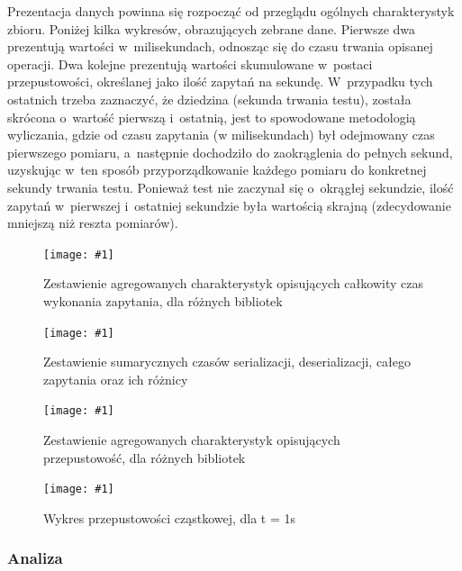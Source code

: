 \documentclass[12pt]{article}
\newcommand{\putfig}[3]{
	\begin{figure}[H]
	\centering
	\texttt{[image: \#1]}
	\caption{#2}
	\label{#3}
	\medskip
\end{figure}
}
\begin{document}
{{{				Prezentacja danych powinna się rozpocząć od przeglądu ogólnych charakterystyk zbioru. Poniżej kilka wykresów, obrazujących zebrane dane.
				Pierwsze dwa prezentują wartości w~milisekundach, odnosząc się do czasu trwania opisanej operacji. Dwa kolejne prezentują wartości skumulowane
				w~postaci przepustowości, określanej jako ilość zapytań na sekundę. W~przypadku tych ostatnich trzeba zaznaczyć, że dziedzina (sekunda trwania testu),
				została skrócona o~wartość pierwszą i~ostatnią, jest to spowodowane metodologią wyliczania, gdzie od czasu zapytania (w milisekundach) był odejmowany
				czas pierwszego pomiaru, a~następnie dochodziło do zaokrąglenia do pełnych sekund, uzyskując w~ten sposób przyporządkowanie każdego pomiaru do konkretnej sekundy trwania testu.
				Ponieważ test nie zaczynał się o~okrągłej sekundzie, ilość zapytań w~pierwszej i~ostatniej sekundzie była wartością skrajną (zdecydowanie mniejszą niż reszta pomiarów).

				{
					\putfig{./charts/pre_generated_charts/total_request_time_per_library_summary.png}{
						Zestawienie agregowanych charakterystyk opisujących całkowity czas wykonania zapytania, dla różnych bibliotek
					}{sumfig_1}
				}

				{
					\putfig{./charts/pre_generated_charts/total_serial_and_deserial_library_summmary.png}{
						Zestawienie sumarycznych czasów serializacji, deserializacji, całego zapytania oraz ich różnicy
					}{sumfig_2}
				}

				{
					\putfig{./charts/pre_generated_charts/throughput_summary_per_library_summary.png}{
						Zestawienie agregowanych charakterystyk opisujących przepustowość, dla różnych bibliotek
					}{sumfig_3}
				}

				{
					\putfig{./charts/output_with_charts_as_images/throughput_per_library.png}{ Wykres przepustowości cząstkowej, dla \Delta t  = 1s}{sumfig_4}
				}
			}

			{
				\subsubsection{Analiza}

}}}
\end{document}
